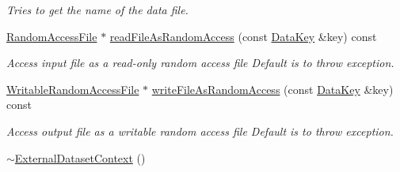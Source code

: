 \begin{DoxyCompactItemize}
\begin{DoxyCompactList}\small\item\em Tries to get the name of the data file. \item\end{DoxyCompactList}\item 
\hyperlink{classBUSBOY_1_1RandomAccessFile}{RandomAccessFile} $\ast$ \hyperlink{classBUSBOY_1_1ExternalDatasetContext_a6379574013a2236a9efba6a823a7a741}{readFileAsRandomAccess} (const \hyperlink{classBUSBOY_1_1DataKey}{DataKey} \&key) const 
\begin{DoxyCompactList}\small\item\em Access input file as a read-\/only random access file Default is to throw exception. \item\end{DoxyCompactList}\item 
\hyperlink{classBUSBOY_1_1WritableRandomAccessFile}{WritableRandomAccessFile} $\ast$ \hyperlink{classBUSBOY_1_1ExternalDatasetContext_a6f81aca310286df497632e916e555bee}{writeFileAsRandomAccess} (const \hyperlink{classBUSBOY_1_1DataKey}{DataKey} \&key) const 
\begin{DoxyCompactList}\small\item\em Access output file as a writable random access file Default is to throw exception. \item\end{DoxyCompactList}\item 
\hyperlink{classBUSBOY_1_1ExternalDatasetContext_a2b884634c3d7d068635bf627badd39f7}{$\sim$ExternalDatasetContext} ()
\end{DoxyCompactItemize}


